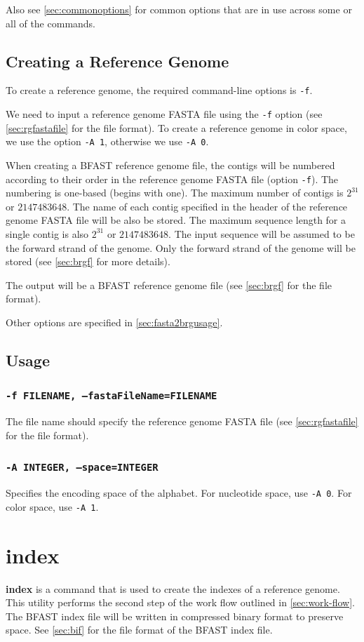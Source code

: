 \documentclass[a4paper,12pt]{book}
\newcommand{\TT}[1]{{\tt #1}} %
\newcommand{\BF}[1]{{\bf #1}} %
\newcommand{\rGFF}{reference genome FASTA file}
\newcommand{\BRGF}{BFAST reference genome file} %
\newcommand{\BIF}{BFAST index file} %
\begin{document}
Also see \autoref{sec:commonoptions} for common options that are in use across some or all of the commands.
\subsection{Creating a Reference Genome}
\label{sec:creating-a-rg}
To create a reference genome, the required command-line options is \TT{-f}.

We need to input a \rGFF{} using the \TT{-f} option (see \autoref{sec:rgfastafile} for the file format).
To create a reference genome in color space, we use the option \TT{-A 1}, otherwise we use \TT{-A 0}.

When creating a \BRGF{}, the contigs will be numbered according to their order in the \rGFF{} (option \TT{-f}).
The numbering is one-based (begins with one).
The maximum number of contigs is $2^{31}$ or $2147483648$.
The name of each contig specified in the header of the \rGFF{} will be also be stored.
The maximum sequence length for a single contig is also $2^{31}$ or $2147483648$. 
The input sequence will be assumed to be the forward strand of the genome.
Only the forward strand of the genome will be stored (see \autoref{sec:brgf} for more details).

The output will be a \BRGF{} (see \autoref{sec:brgf} for the file format).

Other options are specified in \autoref{sec:fasta2brgusage}.
\subsection{Usage}
\label{sec:fasta2brgusage}

\subsubsection{\TT{-f FILENAME, --fastaFileName=FILENAME}}
The file name should specify the \rGFF{} (see \autoref{sec:rgfastafile} for the file format).

\subsubsection{\TT{-A INTEGER, --space=INTEGER}}
Specifies the encoding space of the alphabet.
For nucleotide space, use \TT{-A 0}.
For color space, use \TT{-A 1}.

\section{index}
\label{sec:index}
\BF{index} is a command that is used to create the indexes of a reference genome.
This utility performs the second step of the work flow outlined in \autoref{sec:work-flow}.
The \BIF{} will be written in compressed binary format to preserve space.
See \autoref{sec:bif} for the file format of the \BIF{}.
\end{document}
